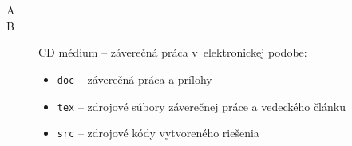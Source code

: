 
\chapter*{\appendixlistname}

\begin{description}

    \item[\appendixname{} A] 
   \item[\appendixname{} B] CD médium -- záverečná práca v~elektronickej podobe:
   \begin{itemize}
    \item \texttt{doc} -- záverečná práca a prílohy
    \item \texttt{tex} -- zdrojové súbory záverečnej práce a vedeckého článku
    \item \texttt{src} -- zdrojové kódy vytvoreného riešenia
   \end{itemize}


\end{description}
